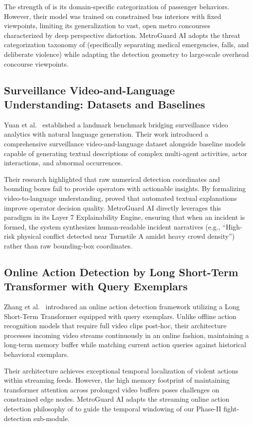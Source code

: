\documentclass[12pt,a4paper]{report}
\begin{document}
The strength of \cite{p4} is its domain-specific categorization of passenger behaviors. However, their model was trained on constrained bus interiors with fixed viewpoints, limiting its generalization to vast, open metro concourses characterized by deep perspective distortion. MetroGuard AI adopts the threat categorization taxonomy of \cite{p4} (specifically separating medical emergencies, falls, and deliberate violence) while adapting the detection geometry to large-scale overhead concourse viewpoints.

\subsection{Surveillance Video-and-Language Understanding: Datasets and Baselines}
Yuan et al.\ \cite{p5} established a landmark benchmark bridging surveillance video analytics with natural language generation. Their work introduced a comprehensive surveillance video-and-language dataset alongside baseline models capable of generating textual descriptions of complex multi-agent activities, actor interactions, and abnormal occurrences.

Their research highlighted that raw numerical detection coordinates and bounding boxes fail to provide operators with actionable insights. By formalizing video-to-language understanding, \cite{p5} proved that automated textual explanations improve operator decision quality. MetroGuard AI directly leverages this paradigm in its Layer 7 Explainability Engine, ensuring that when an incident is formed, the system synthesizes human-readable incident narratives (e.g., ``High-risk physical conflict detected near Turnstile A amidst heavy crowd density'') rather than raw bounding-box coordinates.

\subsection{Online Action Detection by Long Short-Term Transformer with Query Exemplars}
Zhang et al.\ \cite{p20} introduced an online action detection framework utilizing a Long Short-Term Transformer equipped with query exemplars. Unlike offline action recognition models that require full video clips post-hoc, their architecture processes incoming video streams continuously in an online fashion, maintaining a long-term memory buffer while matching current action queries against historical behavioral exemplars.

Their architecture achieves exceptional temporal localization of violent actions within streaming feeds. However, the high memory footprint of maintaining transformer attention across prolonged video buffers poses challenges on constrained edge nodes. MetroGuard AI adapts the streaming online action detection philosophy of \cite{p20} to guide the temporal windowing of our Phase-II fight-detection sub-module.
\end{document}

